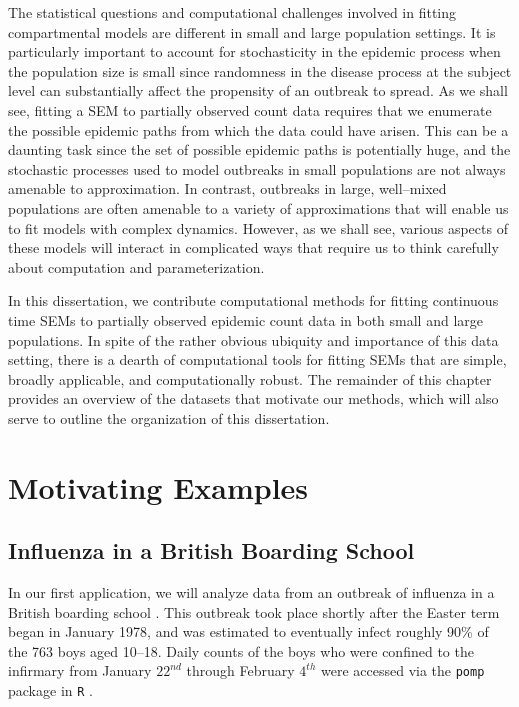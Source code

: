 The statistical questions and computational challenges involved in fitting compartmental models are different in small and large population settings. It is particularly important to account for stochasticity in the epidemic process when the population size is small since randomness in the disease process at the subject level can substantially affect the propensity of an outbreak to spread. As we shall see, fitting a SEM to partially observed count data requires that we enumerate the possible epidemic paths from which the data could have arisen. This can be a daunting task since the set of possible epidemic paths is potentially huge, and the stochastic processes used to model outbreaks in small populations are not always amenable to approximation. In contrast, outbreaks in large, well--mixed populations are often amenable to a variety of approximations that will enable us to fit models with complex dynamics. However, as we shall see, various aspects of these models will interact in complicated ways that require us to think carefully about computation and parameterization. 

In this dissertation, we contribute computational methods for fitting continuous time SEMs to partially observed epidemic count data in both small and large populations. In spite of the rather obvious ubiquity and importance of this data setting, there is a dearth of computational tools for fitting SEMs that are simple, broadly applicable, and computationally robust. The remainder of this chapter provides an overview of the datasets that motivate our methods, which will also serve to outline the organization of this dissertation. 

\section{Motivating Examples}
\label{sec:motivating_examples}
 
\subsection{Influenza in a British Boarding School}
\label{subsec:bbs_descrip}

In our first application, we will analyze data from an outbreak of influenza in a British boarding school \citep{anon1978, davies1982}. This outbreak took place shortly after the Easter term began in January 1978, and was estimated to eventually infect roughly 90\% of the 763 boys aged 10--18. Daily counts of the boys who were confined to the infirmary from January $22^{nd}$ through February $4^{th}$ were accessed via the \texttt{pomp} package in \texttt{R} \citep{pomp}.

